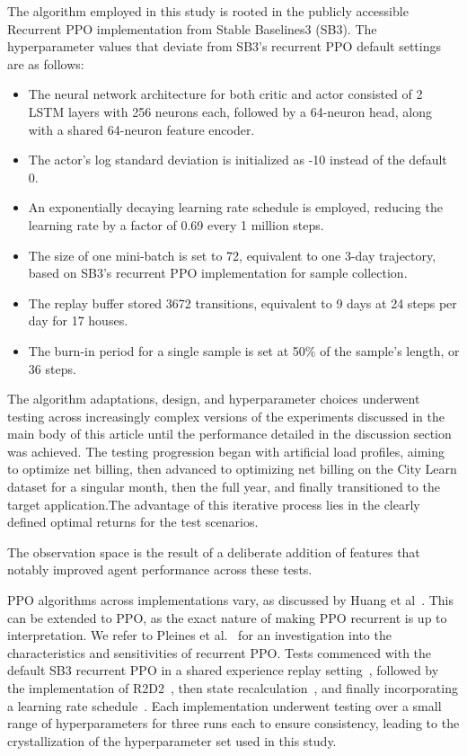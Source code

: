 \documentclass[preprint, 12pt]{elsarticle}
\begin{document}
The algorithm employed in this study is rooted in the publicly accessible Recurrent PPO implementation from Stable Baselines3 (SB3)\cite{SB3}.
The hyperparameter values that deviate from SB3's recurrent PPO default settings are as follows:
\begin{itemize}
    \item The neural network architecture for both critic and actor consisted of 2 LSTM layers with 256 neurons each, followed by a 64-neuron head, along with a shared 64-neuron feature encoder.
    \item The actor's log standard deviation is initialized as -10 instead of the default 0.
    \item An exponentially decaying learning rate schedule is employed, reducing the learning rate by a factor of 0.69 every 1 million steps.
    \item The size of one mini-batch is set to 72, equivalent to one 3-day trajectory, based on SB3's recurrent PPO implementation for sample collection.
    \item The replay buffer stored 3672 transitions, equivalent to 9 days at 24 steps per day for 17 houses.
    \item The burn-in period for a single sample is set at 50\% of the sample's length, or 36 steps.
\end{itemize}

The algorithm adaptations, design, and hyperparameter choices underwent testing across increasingly complex versions of the experiments discussed in the main body of this article until the performance detailed in the discussion section was achieved.
The testing progression began with artificial load profiles, aiming to optimize net billing, then advanced to optimizing net billing on the City Learn dataset for a singular month, then the full year, and finally transitioned to the target application.The advantage of this iterative process lies in the clearly defined optimal returns for the test scenarios.

The observation space is the result of a deliberate addition of features that notably improved agent performance across these tests.

PPO algorithms across implementations vary, as discussed by Huang et al~\cite{Huang_PPOReimplementation}. This can be extended to PPO, as the exact nature of making PPO recurrent is up to interpretation. We refer to Pleines et al.~\cite{RecurrentPPO_ImplementationDetails} for an investigation into the characteristics and sensitivities of recurrent PPO.
Tests commenced with the default SB3 recurrent PPO in a shared experience replay setting~\cite{SharedExperienceAC}, followed by the implementation of R2D2~\cite{Kapturowski_R2D2}, then state recalculation~\cite{HiddenStateRecalc}, and finally incorporating a learning rate schedule~\cite{Ilyas_LookAtDRL_PG}. 
Each implementation underwent testing over a small range of hyperparameters for three runs each to ensure consistency, leading to the crystallization of the hyperparameter set used in this study.
\end{document}
